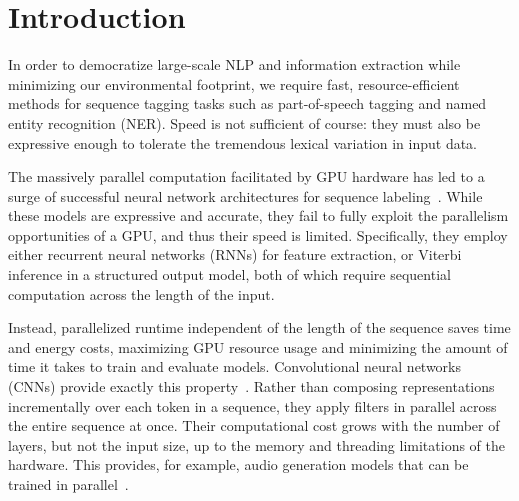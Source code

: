 \section{Introduction}


In order to democratize large-scale NLP and information extraction while minimizing our environmental footprint, we require fast, resource-efficient methods for sequence tagging tasks such as part-of-speech tagging and named entity recognition (NER). Speed is not sufficient of course: they must also be expressive enough to tolerate the tremendous lexical variation in input data. 

The massively parallel computation facilitated by GPU hardware has led to a surge of successful neural network architectures for sequence labeling~\citep{ling2015finding,ma2016end,chiu2016named,lample2016neural}. While these models are expressive and accurate, they fail to fully exploit the parallelism opportunities of a GPU, and thus their speed is limited. Specifically, they employ either recurrent neural networks (RNNs) for feature extraction, or Viterbi inference in a structured output model, both of which require sequential computation across the length of the input.

Instead, parallelized runtime independent of the length of the sequence saves time and energy costs, maximizing GPU resource usage and minimizing the amount of time it takes to train and evaluate models. Convolutional neural networks (CNNs) provide exactly this property~\citep{kim2014convolutional,kalchbrenner2014convolutional}. Rather than composing representations incrementally over each token in a sequence, they apply filters in parallel across the entire sequence at once.  Their computational cost grows with the number of layers, but not the input size, up to the memory and threading limitations of the hardware. This provides, for example, audio generation models that can be trained in parallel~\citep{vandenoord2016wavenet}. 




